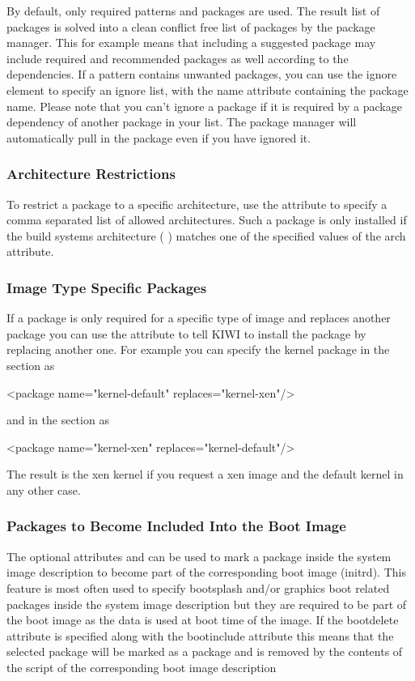 By default, only required patterns and packages are used. The result
list of packages is solved into a clean conflict free list of packages
by the package manager. This for example means that including a suggested
package may include required and recommended packages as well according
to the dependencies. If a pattern contains unwanted packages, you can use
the ignore element to specify an ignore list, with the name attribute
containing the package name. Please note that you can't ignore a package
if it is required by a package dependency of another package in your list.
The package manager will automatically pull in the package even if you have
ignored it.

\subsubsection{Architecture Restrictions}
To restrict a package to a specific architecture, use
the  attribute to specify a comma separated list of allowed
architectures. Such a package is only installed if the build systems
architecture ( ) matches one of the specified values of the arch
attribute.

\subsubsection{Image Type Specific Packages}
If a package is only required for a specific type of image
and replaces another package you can use the  attribute
to tell KIWI to install the package by replacing another one. For example
you can specify the kernel package in the  section as

\begin{xml}
<package name="kernel-default" replaces="kernel-xen"/>
\end{xml}

and in the  section as

\begin{xml}
<package name="kernel-xen" replaces="kernel-default"/>
\end{xml}

The result is the xen kernel if you request a xen image and the
default kernel in any other case.

\subsubsection{Packages to Become Included Into the Boot Image}
The optional attributes  and 
can be used to mark a package inside the system image description to
become part of the corresponding boot image (initrd). This feature
is most often used to specify bootsplash and/or graphics boot related
packages inside the system image description but they are required
to be part of the boot image as the data is used at boot time
of the image. If the bootdelete attribute is specified along with
the bootinclude attribute this means that the selected package
will be marked as a  package and is
removed by the contents of the 
 script of the corresponding
boot image description

